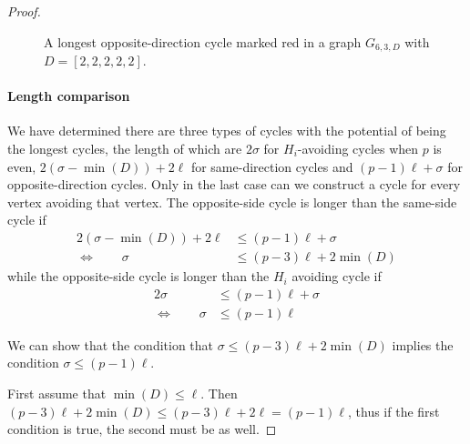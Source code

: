 \begin{proof}
\begin{figure}
  \caption{A longest opposite-direction cycle marked red in a graph $G_{6,3,D}$ with $D=[2,2,2,2,2]$.}
  \label{fig:opposite-side:g632}
\end{figure}

\paragraph{Length comparison}
We have determined there are three types of cycles with the potential of being the longest cycles, the length of which are $2\sigma$ for $H_i$-avoiding cycles when $p$ is even, $2(\sigma - \min(D))+2\ell$ for same-direction cycles and $(p-1)\ell + \sigma$ for opposite-direction cycles. Only in the last case can we construct a cycle for every vertex avoiding that vertex. The opposite-side cycle is longer than the same-side cycle if
\[
\begin{aligned}
2(\sigma-\min(D))+2\ell
    &\le (p-1)\ell + \sigma\\
\iff\qquad
\sigma
    &\le (p-3)\ell + 2\min(D)
\end{aligned}
\]
while the opposite-side cycle is longer than the $H_i$ avoiding cycle if
\[
\begin{aligned}
2\sigma
    &\le (p-1)\ell + \sigma\\
\iff\qquad
\sigma
    &\le (p-1)\ell
\end{aligned}
\]

We can show that the condition that $\sigma \le (p-3)\ell + 2\min(D)$ implies the condition $\sigma \le (p-1)\ell$.

First assume that $\min(D) \le \ell$. Then $(p-3)\ell + 2\min(D) \le (p-3)\ell + 2\ell = (p-1)\ell$, thus if the first condition is true, the second must be as well. 


\end{proof}
